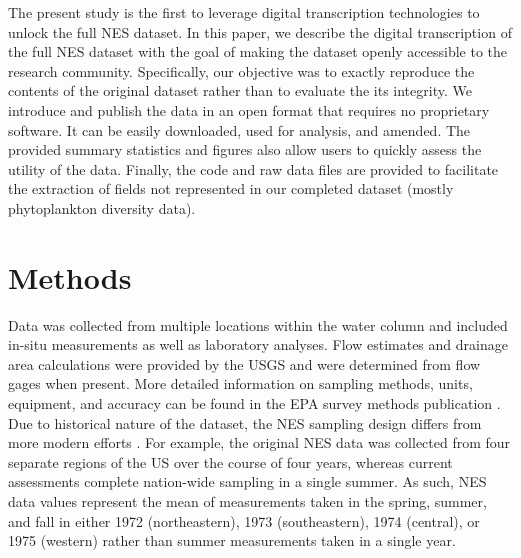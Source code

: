 \documentclass[journal abbreviations, manuscript]{copernicus}
\begin{document}
The present study is the first to leverage digital transcription technologies to unlock the full NES dataset. In this paper, we describe the digital transcription of the full NES dataset with the goal of making the dataset openly accessible to the research community. Specifically, our objective was to exactly reproduce the contents of the original dataset rather than to evaluate the its integrity. We introduce and publish the data in an open format that requires no proprietary software. It can be easily downloaded, used for analysis, and amended. The provided summary statistics and figures also allow users to quickly assess the utility of the data. Finally, the code and raw data files are provided to facilitate the extraction of fields not represented in our completed dataset (mostly phytoplankton diversity data).

\section{Methods}

Data was collected from multiple locations within the water column and included in-situ measurements as well as laboratory analyses. Flow estimates and drainage area calculations were provided by the USGS and were determined from flow gages when present. More detailed information on sampling methods, units, equipment, and accuracy can be found in the EPA survey methods publication \citep{nes-methods}. Due to historical nature of the dataset, the NES sampling design differs from more modern efforts \citep{nla-methods}. For example, the original NES data was collected from four separate regions of the US over the course of four years, whereas current assessments complete nation-wide sampling in a single summer. As such, NES data values represent the mean of measurements taken in the spring, summer, and fall in either 1972 (northeastern), 1973 (southeastern), 1974 (central), or 1975 (western) rather than summer measurements taken in a single year.
\end{document}

